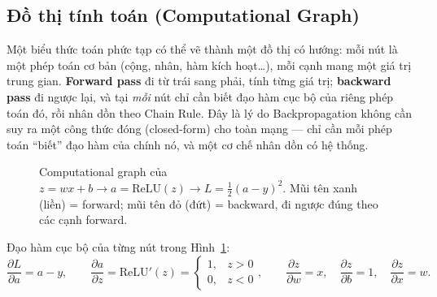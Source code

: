 \documentclass[12pt,a4paper]{report}
\makeatletter
\renewcommand\small{\@setfontsize\small{13}{16.5}}
\makeatother
\begin{document}
\subsection{Đồ thị tính toán (Computational Graph)}
\label{sec:compgraph}

Một biểu thức toán phức tạp có thể vẽ thành một đồ thị có hướng: mỗi nút là
một phép toán cơ bản (cộng, nhân, hàm kích hoạt\ldots), mỗi cạnh mang một
giá trị trung gian. \textbf{Forward pass} đi từ trái sang phải, tính từng
giá trị; \textbf{backward pass} đi ngược lại, và tại \emph{mỗi} nút chỉ cần
biết đạo hàm cục bộ của riêng phép toán đó, rồi nhân dồn theo Chain Rule.
Đây là lý do Backpropagation không cần suy ra một công thức đóng
(closed-form) cho toàn mạng --- chỉ cần mỗi phép toán ``biết'' đạo hàm của
chính nó, và một cơ chế nhân dồn có hệ thống.

\begin{figure}[htbp]
\centering
{}
\caption{Computational graph của $z=wx+b \to a=\mathrm{ReLU}(z) \to L=\tfrac12(a-y)^2$.
Mũi tên xanh (liền) = forward; mũi tên đỏ (đứt) = backward, đi ngược đúng
theo các cạnh forward.}
\label{fig:compgraph}
\end{figure}

Đạo hàm cục bộ của từng nút trong Hình~\ref{fig:compgraph}:
$$\frac{\partial L}{\partial a}=a-y,\qquad
\frac{\partial a}{\partial z}=\mathrm{ReLU}'(z)=\begin{cases}1,& z>0\\0,& z< 0\end{cases},\qquad
\frac{\partial z}{\partial w}=x,\quad \frac{\partial z}{\partial b}=1,\quad \frac{\partial z}{\partial x}=w.$$
\end{document}
